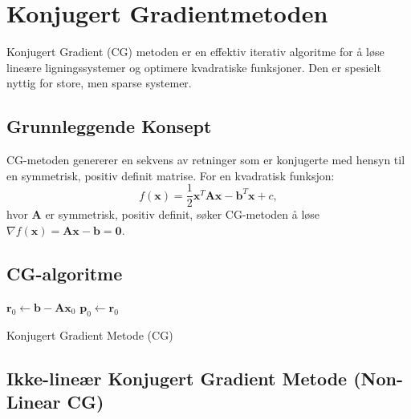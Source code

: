 \section{Konjugert Gradientmetoden}
\label{sec:conjugate_gradient}

Konjugert Gradient (CG) metoden er en effektiv iterativ algoritme for å løse lineære ligningssystemer og optimere kvadratiske funksjoner. Den er spesielt nyttig for store, men sparse systemer.

\subsection{Grunnleggende Konsept}
CG-metoden genererer en sekvens av retninger som er konjugerte med hensyn til en symmetrisk, positiv definit matrise. For en kvadratisk funksjon:
\[
	f(\symbf{x}) = \frac{1}{2}\symbf{x}^T\symbf{A}\symbf{x} - \symbf{b}^T\symbf{x} + c,
\]
hvor \(\symbf{A}\) er symmetrisk, positiv definit, søker CG-metoden å løse \(\nabla f(\symbf{x}) = \symbf{A}\symbf{x} - \symbf{b} = \symbf{0}\).

\subsection{CG-algoritme}

\begin{algorithm}[H]
	\SetAlgoLined
	\(\symbf{r}_0 \gets \symbf{b} - \symbf{A}\symbf{x}_0\) 
	\(\symbf{p}_0 \gets \symbf{r}_0\) 
	\caption{Konjugert Gradient Metode (CG)}
\end{algorithm}

\subsection{Ikke-lineær Konjugert Gradient Metode (Non-Linear CG)}


